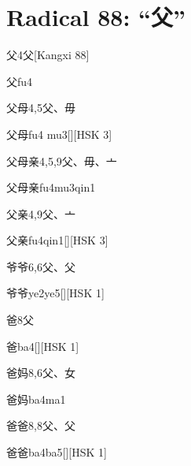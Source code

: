 
\section*{Radical 88: ``⽗''}

\begin{entry}{父}{4}{⽗}[Kangxi 88]
  \begin{phonetics}{父}{fu4}
  \end{phonetics}
\end{entry}

\begin{entry}{父母}{4,5}{⽗、⽏}
  \begin{phonetics}{父母}{fu4 mu3}[][HSK 3]
  \end{phonetics}
\end{entry}

\begin{entry}{父母亲}{4,5,9}{⽗、⽏、⼇}
  \begin{phonetics}{父母亲}{fu4mu3qin1}
  \end{phonetics}
\end{entry}

\begin{entry}{父亲}{4,9}{⽗、⼇}
  \begin{phonetics}{父亲}{fu4qin1}[][HSK 3]
  \end{phonetics}
\end{entry}

\begin{entry}{爷爷}{6,6}{⽗、⽗}
  \begin{phonetics}{爷爷}{ye2ye5}[][HSK 1]
  \end{phonetics}
\end{entry}

\begin{entry}{爸}{8}{⽗}
  \begin{phonetics}{爸}{ba4}[][HSK 1]
  \end{phonetics}
\end{entry}

\begin{entry}{爸妈}{8,6}{⽗、⼥}
  \begin{phonetics}{爸妈}{ba4ma1}
  \end{phonetics}
\end{entry}

\begin{entry}{爸爸}{8,8}{⽗、⽗}
  \begin{phonetics}{爸爸}{ba4ba5}[][HSK 1]
  \end{phonetics}
\end{entry}


